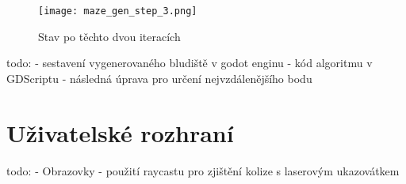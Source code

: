 \begin{figure}[H]
  \centering
  \texttt{[image: maze\_gen\_step\_3.png]}
  \caption{Stav po těchto dvou iteracích}
\end{figure}

todo:
- sestavení vygenerovaného bludiště v godot enginu
- kód algoritmu v GDScriptu
- následná úprava pro určení nejvzdálenějšího bodu

\label{uzivatelske_rozhrani}
\section{Uživatelské rozhraní}

todo:
- Obrazovky
- použití raycastu pro zjištění kolize s laserovým ukazovátkem